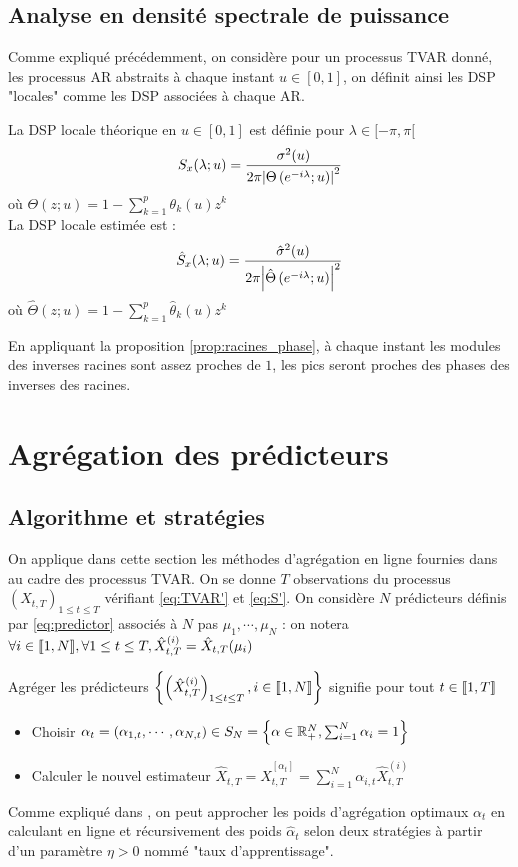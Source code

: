 \documentclass{report}
\begin{document}
\subsection{Analyse en densité spectrale de puissance}
Comme expliqué précédemment, on considère pour un processus TVAR donné, les processus AR abstraits à chaque instant $u\in [0,1]$, on définit ainsi les DSP "locales" comme les DSP associées à chaque AR.
\begin{Def}[DSP]
La DSP locale théorique en $u\in [0,1]$ est définie pour $\lambda \in [-\pi, \pi[$ 
$$
S_x(\lambda ; u) = \frac{\sigma^2(u)}{2\pi{ \left| \Theta\left( e^{-i\lambda} ; u \right) \right|}^2}
$$
où $\Theta(z;u) = 1 - \sum_{k=1}^p \theta_k(u) z^k$ \\
La DSP locale estimée est : 
$$
\hat{S}_x(\lambda ; u) = \frac{\hat{\sigma}^2(u)}{2\pi{ \left| \hat{\Theta}\left( e^{-i\lambda} ; u \right) \right|}^2}
$$
où $\hat{\Theta}(z;u) = 1 - \sum_{k=1}^p \hat{\theta}_k(u) z^k$
\end{Def}

En appliquant la proposition \ref{prop:racines_phase}, à chaque instant les modules des inverses racines sont assez proches de $1$, les pics seront proches des phases des inverses des racines.
\section{Agrégation des prédicteurs}
\subsection{Algorithme et stratégies}
On applique dans cette section les méthodes d'agrégation en ligne fournies dans \citep{giraud-roueff-sanchez-aos2015} au cadre des processus TVAR. On se donne $T$ observations du processus $(X_{t,T})_{1 \leq t \leq T}$ vérifiant \eqref{eq:TVAR'} et \eqref{eq:S'}. On considère $N$ prédicteurs définis par \eqref{eq:predictor} associés à $N$ pas $\mu_1, \cdots, \mu_N$ : on notera $\forall i \in {\left\llbracket 1,N \right\rrbracket}, \forall 1\leq t \leq T, \hat{X}_{t,T}^{(i)} = \hat{X}_{t,T}(\mu_i)$
\begin{Def}[Agrégation]
Agréger les prédicteurs ${ \left\lbrace \left(\hat{X}_{t,T}^{(i)}\right)_{1\leq t\leq T}, i\in {\left\llbracket 1,N \right\rrbracket} \right\rbrace }$ signifie pour tout $t\in {\left\llbracket 1,T \right\rrbracket}$
\begin{itemize}
\item Choisir $\alpha_t=(\alpha_{1,t},\cdots,\alpha_{N,t})\in S_N = { \left\lbrace \alpha \in \mathbb{R}_+^N, \sum_{i=1}^N \alpha_{i} = 1 \right\rbrace }$ 
\item Calculer le nouvel estimateur $\hat{X}_{t,T} = \hat{X}_{t,T}^{[\alpha_t]} = \sum_{i=1}^N \alpha_{i,t} \hat{X}_{t,T}^{(i)}$
\end{itemize}
\end{Def}
Comme expliqué dans \citep{giraud-roueff-sanchez-aos2015}, on peut approcher les poids d'agrégation optimaux $\alpha_t$ en calculant en ligne et récursivement des poids $\hat{\alpha}_t$ selon deux stratégies à partir d'un paramètre $\eta >0$ nommé "taux d'apprentissage". \\
\end{document}
